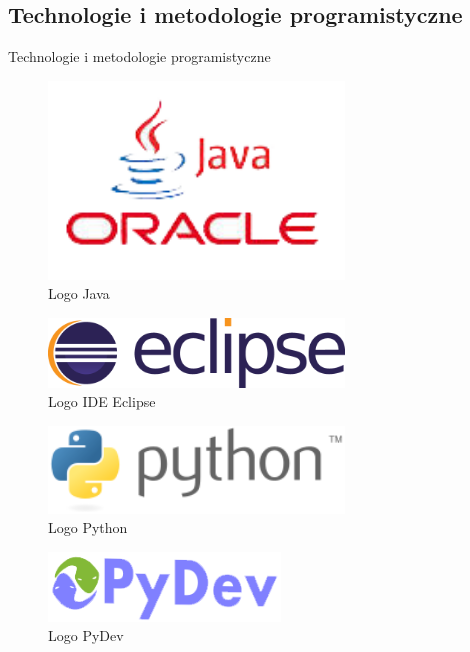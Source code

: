 \documentclass{beamer}
\begin{document}
\subsection{Technologie i metodologie programistyczne}
\begin{frame}{Technologie i metodologie programistyczne} 

\centering
\begin{minipage}[b]{.48\textwidth}

\begin{figure}
\includegraphics[width=0.7\textwidth]{img/java}
\caption{Logo Java\cite{java}}
\end{figure}
\begin{figure}
\includegraphics[width=0.7\textwidth]{img/eclipse}
\caption{Logo IDE Eclipse\cite{eclipse}}
\end{figure}

\end{minipage}\hfill
\begin{minipage}[b]{.48\textwidth}

\begin{figure}
\includegraphics[width=0.7\textwidth]{img/py}
\caption{Logo Python\cite{python}}
\end{figure}
\begin{figure}
\includegraphics[width=0.55\textwidth]{img/pydev}
\caption{Logo PyDev\cite{pydev}}
\end{figure}

\end{minipage}\hfill
\end{frame}
\end{document}
